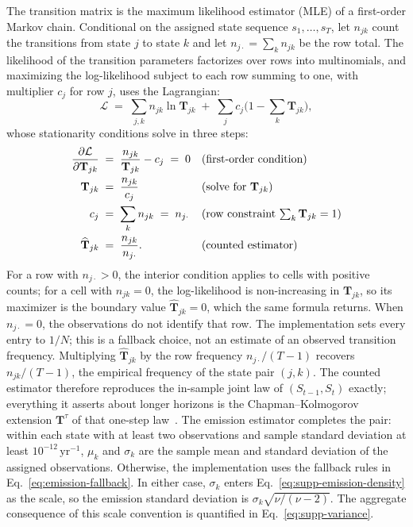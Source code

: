 The transition matrix is the maximum likelihood estimator (MLE) of a
first-order Markov chain. Conditional on the assigned state sequence
$s_1, \dots, s_T$, let $n_{jk}$ count the transitions from state $j$
to state $k$ and let $n_{j \cdot} = \sum_k n_{jk}$ be the row total.
The likelihood of the transition parameters factorizes over rows into
multinomials, and maximizing the log-likelihood subject to each row
summing to one, with multiplier $c_j$ for row $j$, uses the
Lagrangian:
\begin{equation}
  \mathcal{L} \;=\; \sum_{j, k} n_{jk} \ln \mathbf{T}_{jk}
    \;+\; \sum_{j} c_{j} \Big(1 - \sum_{k} \mathbf{T}_{jk}\Big),
  \label{eq:supp-lagrangian}
\end{equation}
whose stationarity conditions solve in three steps:
\begin{align}
  \frac{\partial \mathcal{L}}{\partial \mathbf{T}_{jk}}
   &\;=\; \frac{n_{jk}}{\mathbf{T}_{jk}} - c_j \;=\; 0
     && \text{(first-order condition)} \notag \\
  \mathbf{T}_{jk}
   &\;=\; \frac{n_{jk}}{c_j}
     && \text{(solve for $\mathbf{T}_{jk}$)} \notag \\
  c_j
   &\;=\; \sum_{k} n_{jk} \;=\; n_{j \cdot}
     && \text{(row constraint $\textstyle\sum_k \mathbf{T}_{jk} = 1$)} \notag \\
  \widehat{\mathbf{T}}_{jk}
   &\;=\; \frac{n_{jk}}{n_{j \cdot}}.
     && \text{(counted estimator)}
  \label{eq:supp-markov-mle}
\end{align}
For a row with $n_{j\cdot}>0$, the interior condition applies to
cells with positive counts; for a cell with $n_{jk}=0$, the
log-likelihood is non-increasing in
$\mathbf{T}_{jk}$, so its maximizer is the boundary value
$\widehat{\mathbf{T}}_{jk}=0$, which the same formula returns.
When $n_{j\cdot}=0$, the observations do not identify that row.
The implementation sets every entry to $1/N$; this is a fallback
choice, not an estimate of an observed transition frequency.
Multiplying $\widehat{\mathbf{T}}_{jk}$ by the row frequency
$n_{j\cdot}/(T-1)$ recovers $n_{jk}/(T-1)$, the empirical frequency of
the state pair $(j, k)$. The counted estimator therefore reproduces
the in-sample joint law of $(S_{t-1}, S_t)$ exactly; everything it
asserts about longer horizons is the Chapman--Kolmogorov extension
$\mathbf{T}^\tau$ of that one-step law~\cite{bilmes1998,
grinsteadSnell1997}. The emission estimator completes the pair: within
each state with at least two observations and sample standard
deviation at least $10^{-12}\,\mathrm{yr}^{-1}$, $\mu_k$ and
$\sigma_k$ are the sample mean and standard deviation of the assigned
observations. Otherwise, the implementation uses the fallback rules
in Eq.~\eqref{eq:emission-fallback}. In either case, $\sigma_k$ enters
Eq.~\eqref{eq:supp-emission-density} as the scale, so the emission
standard deviation is $\sigma_k \sqrt{\nu/(\nu - 2)}$. The aggregate
consequence of this scale convention is quantified in
Eq.~\eqref{eq:supp-variance}.


